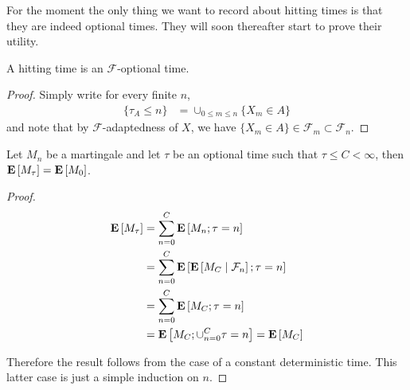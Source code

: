 For the moment the only thing we want to record about hitting times is
that they are indeed optional times.  They will soon thereafter start to prove their utility.
\begin{lem}\label{HittingTimesDiscrete}A hitting time is an
  $\mathcal{F}$-optional time.
\end{lem}
\begin{proof}
Simply write for every finite $n$,
\begin{align*}
\lbrace \tau_A \leq n \rbrace &= \cup_{0 \leq m \leq n} \lbrace X_m
\in A \rbrace
\end{align*}
and note that by $\mathcal{F}$-adaptedness of $X$, we have $\lbrace X_m
\in A \rbrace \in \mathcal{F}_m \subset \mathcal{F}_n$.
\end{proof}

\begin{lem}Let $M_n$ be a martingale and let $\tau$ be an optional
  time such that $\tau \leq C < \infty$, then $\expectation{M_\tau} =
  \expectation{M_0}$.
\end{lem}
\begin{proof}
\begin{align*}
\expectation{M_\tau} &= \sum_{n=0}^C \expectation{M_n ; \tau=n} \\
&=\sum_{n=0}^C \expectation{\cexpectationlong{\mathcal{F}_n}{M_C} ;
  \tau=n} \\
&=\sum_{n=0}^C \expectation{M_C ;
  \tau=n} \\
&=\expectation{M_C ;
  \cup_{n=0}^C \tau=n} = \expectation{M_C}\\
\end{align*}

Therefore the result follows from the case of a constant deterministic
time.  This latter case is just a simple induction on $n$.
\end{proof}


